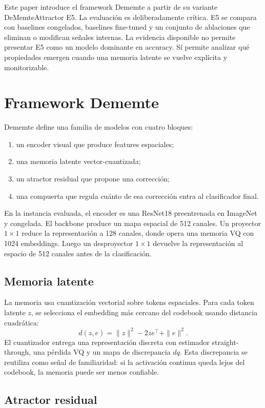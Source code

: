 \documentclass[11pt,a4paper]{article}
\begin{document}
Este paper introduce el framework Dememte a partir de su variante
DeMemteAttractor E5. La evaluación es deliberadamente crítica. E5 se compara con
baselines congelados, baselines fine-tuned y un conjunto de ablaciones que
eliminan o modifican señales internas. La evidencia disponible no permite
presentar E5 como un modelo dominante en accuracy. Sí permite analizar qué
propiedades emergen cuando una memoria latente se vuelve explícita y
monitorizable.

\section{Framework Dememte}

Dememte define una familia de modelos con cuatro bloques:
\begin{enumerate}
    \item un encoder visual que produce features espaciales;
    \item una memoria latente vector-cuantizada;
    \item un atractor residual que propone una corrección;
    \item una compuerta que regula cuánto de esa corrección entra al
    clasificador final.
\end{enumerate}

En la instancia evaluada, el encoder es una ResNet18 preentrenada en ImageNet y
congelada. El backbone produce un mapa espacial de 512 canales. Un proyector
$1\times1$ reduce la representación a 128 canales, donde opera una memoria VQ
con 1024 embeddings. Luego un desproyector $1\times1$ devuelve la representación
al espacio de 512 canales antes de la clasificación.

\subsection{Memoria latente}

La memoria usa cuantización vectorial sobre tokens espaciales. Para cada token
latente $z$, se selecciona el embedding más cercano del codebook usando distancia
cuadrática:
\[
d(z,e)=\|z\|^2 - 2ze^\top + \|e\|^2.
\]
El cuantizador entrega una representación discreta con estimador
straight-through, una pérdida VQ y un mapa de discrepancia $dq$. Esta
discrepancia se reutiliza como señal de familiaridad: si la activación continua
queda lejos del codebook, la memoria puede ser menos confiable.

\subsection{Atractor residual}
\end{document}
